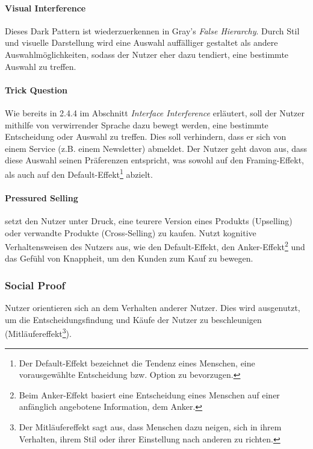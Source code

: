 \documentclass[a4paper]{article}
\begin{document}
\paragraph{Visual Interference}
Dieses Dark Pattern ist wiederzuerkennen in Gray's \textit{False Hierarchy}. 
Durch Stil und visuelle Darstellung wird eine Auswahl auffälliger gestaltet als andere Auswahlmöglichkeiten, sodass der Nutzer eher dazu tendiert, eine bestimmte Auswahl zu treffen.

\paragraph{Trick Question}
Wie bereits in 2.4.4 im Abschnitt \textit{Interface Interference} erläutert, soll der Nutzer mithilfe von verwirrender Sprache dazu bewegt werden, eine bestimmte Entscheidung oder Auswahl zu treffen. Dies soll verhindern, dass er sich von einem Service (z.B. einem Newsletter) abmeldet. Der Nutzer geht davon aus, dass diese Auswahl seinen Präferenzen entspricht, was sowohl auf den Framing-Effekt, als auch auf den Default-Effekt\footnote{\label{foot:6} Der Default-Effekt bezeichnet die Tendenz eines Menschen, eine vorausgewählte Entscheidung bzw. Option zu bevorzugen.} abzielt.

\paragraph{Pressured Selling} setzt den Nutzer unter Druck, eine teurere Version eines Produkts (Upselling) oder verwandte Produkte (Cross-Selling) zu kaufen. Nutzt kognitive Verhaltensweisen des Nutzers aus, wie den Default-Effekt, den Anker-Effekt\footnote{\label{foot:7} Beim Anker-Effekt basiert eine Entscheidung eines Menschen auf einer anfänglich angebotene Information, dem \glqq Anker\grqq{}. } und das Gefühl von Knappheit, um den Kunden zum Kauf zu bewegen.


\subsubsection{Social Proof}
Nutzer orientieren sich an dem Verhalten anderer Nutzer. Dies wird ausgenutzt, um die Entscheidungsfindung und Käufe der Nutzer zu beschleunigen (Mitläufereffekt\footnote{\label{foot:5} Der Mitläufereffekt sagt aus, dass Menschen dazu neigen, sich in ihrem Verhalten, ihrem Stil oder ihrer Einstellung nach anderen zu richten.}).
\end{document}
